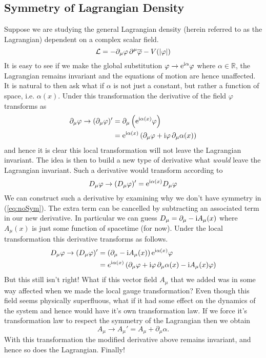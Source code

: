 \subsection{Symmetry of Lagrangian Density}\label{lagdensym}
Suppose we are studying the general Lagrangian density (herein referred to as the Lagrangian) dependent on a complex scalar field.
\begin{equation}\label{eq:complexScalar}
\mathcal{L} = -\partial_\mu\varphi\,\partial^\mu\overline{\varphi} - V(|\varphi|)
\end{equation}
It is easy to see if we make the global substitution $\varphi\to\mathrm{e}^{\mathrm{i} \alpha}\varphi$ where $\alpha\in \mathbb{R}$, the Lagrangian remains invariant and the equations of motion are hence unaffected. It is natural to then ask what if $\alpha$ is not just a constant, but rather a function of space, i.e. $\alpha(x)$. Under this transformation the derivative of the field $\varphi$ transforms as
\begin{align}\label{eq:noSym}
\partial_\mu\varphi\to (\partial_\mu\varphi)' & = \partial_\mu\left(\mathrm{e}^{\mathrm{i}\alpha(x)}\varphi\right) \nonumber\\
 & = \mathrm{e}^{\mathrm{i}\alpha(x)}\left(\partial_\mu\varphi + \mathrm{i}\varphi\,\partial_\mu\alpha(x)\right)
\end{align}
and hence it is clear this local transformation will not leave the Lagrangian invariant. The idea is then to build a new type of derivative what \textit{would} leave the Lagrangian invariant. Such a derivative would transform according to
\begin{equation*}
D_\mu\varphi\to(D_\mu\varphi)' = \mathrm{e}^{\mathrm{i}\alpha(x)}D_\mu\varphi
\end{equation*}
We can construct such a derivative by examining why we don't have symmetry in (\ref{eq:noSym}). The extra term can be cancelled by subtracting an associated term in our new derivative. In particular we can guess $D_\mu = \partial_\mu - \mathrm{i} A_\mu(x)$ where $A_\mu(x)$ is just some function of spacetime (for now). Under the local transformation this derivative transforms as follows.
\begin{align*}
D_\mu\varphi \to (D_\mu\varphi)' & = \left(\partial_\mu  - \mathrm{i} A_\mu(x)\right)\mathrm{e}^{\mathrm{i}\alpha(x)}\varphi \\
 & = e^{\mathrm{i}\alpha(x)}\left(\partial_\mu\varphi + \mathrm{i} \varphi\, \partial_\mu \alpha(x) - \mathrm{i} A_\mu(x)\varphi\right)
\end{align*}
But this still isn't right! What if this vector field $A_\mu$ that we added was in some way affected when we made the local gauge transformation? Even though this field seems physically superfluous, what if it had some effect on the dynamics of the system and hence would have it's own transformation law. If we force it's transformation law to respect the symmetry of the Lagrangian then we obtain
\begin{equation}\label{eq:vectorTrans}
A_\mu\to A_\mu' = A_\mu + \partial_\mu\alpha.
\end{equation}
With this transformation the modified derivative above remains invariant, and hence so does the Lagrangian. Finally!

